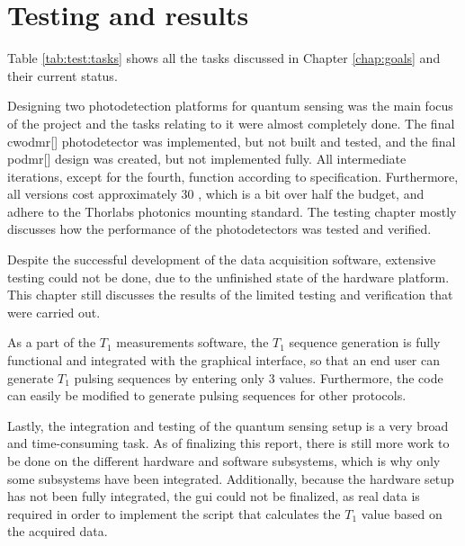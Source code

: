 \chapter{Testing and results}\label{chap:conclusion}

Table \ref{tab:test:tasks} shows all the tasks discussed in Chapter \ref{chap:goals} and their current status. 


Designing two photodetection platforms for quantum sensing was the main focus of the project and the tasks relating to it were almost completely done. The final \gls{cwodmr}[] photodetector was implemented, but not built and tested, and the final \gls{podmr}[] design was created, but not implemented fully. All intermediate iterations, except for the fourth, function according to specification. Furthermore, all versions cost approximately 30 \texteuro, which is a bit over half the budget, and adhere to the Thorlabs photonics mounting standard. The testing chapter mostly discusses how the performance of the photodetectors was tested and verified. 

Despite the successful development of the data acquisition software, extensive testing could not be done, due to the unfinished state of the hardware platform. This chapter still discusses the results of the limited testing and verification that were carried out.

As a part of the $T_1$ measurements software, the $T_1$ sequence generation is fully functional and integrated with the graphical interface, so that an end user can generate $T_1$ pulsing sequences by entering only 3 values. Furthermore, the code can easily be modified to generate pulsing sequences for other protocols.

Lastly, the integration and testing of the quantum sensing setup is a very broad and time-consuming task. As of finalizing this report, there is still more work to be done on the different hardware and software subsystems, which is why only some subsystems have been integrated. Additionally, because the hardware setup has not been fully integrated, the \gls{gui} could not be finalized, as real data is required in order to implement the script that calculates the $T_1$ value based on the acquired data.


